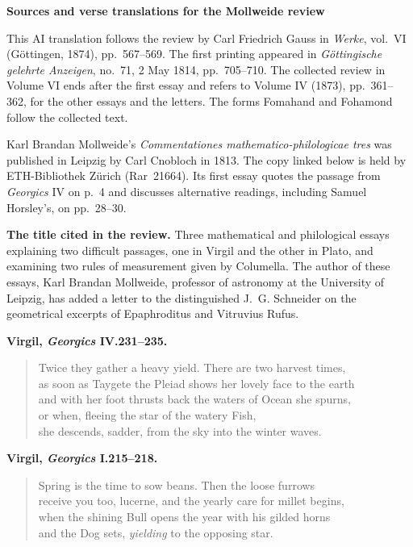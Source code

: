 \clearpage\thispagestyle{empty}
\begin{center}\Large\bfseries Sources and verse translations for the Mollweide review\end{center}

This AI translation follows the review by Carl Friedrich Gauss in \emph{Werke}, vol.~VI (Göttingen, 1874), pp.~567--569. The first printing appeared in \emph{Göttingische gelehrte Anzeigen}, no.~71, 2 May 1814, pp.~705--710. The collected review in Volume VI ends after the first essay and refers to Volume IV (1873), pp.~361--362, for the other essays and the letters. The forms Fomahand and Fohamond follow the collected text.

Karl Brandan Mollweide’s \emph{Commentationes mathematico-philologicae tres} was published in Leipzig by Carl Cnobloch in 1813. The copy linked below is held by ETH-Bibliothek Zürich (Rar~21664). Its first essay quotes the passage from \emph{Georgics} IV on p.~4 and discusses alternative readings, including Samuel Horsley’s, on pp.~28--30.

\noindent\textbf{The title cited in the review.} Three mathematical and philological essays explaining two difficult passages, one in Virgil and the other in Plato, and examining two rules of measurement given by Columella. The author of these essays, Karl Brandan Mollweide, professor of astronomy at the University of Leipzig, has added a letter to the distinguished J.~G. Schneider on the geometrical excerpts of Epaphroditus and Vitruvius Rufus.

\noindent\textbf{Virgil, \emph{Georgics} IV.231--235.}
\begin{quote}\small Twice they gather a heavy yield. There are two harvest times,\\
as soon as Taygete the Pleiad shows her lovely face to the earth\\
and with her foot thrusts back the waters of Ocean she spurns,\\
or when, fleeing the star of the watery Fish,\\
she descends, sadder, from the sky into the winter waves.\end{quote}

\noindent\textbf{Virgil, \emph{Georgics} I.215--218.}
\begin{quote}\small Spring is the time to sow beans. Then the loose furrows\\
receive you too, lucerne, and the yearly care for millet begins,\\
when the shining Bull opens the year with his gilded horns\\
and the Dog sets, \emph{yielding} to the opposing star.\end{quote}

